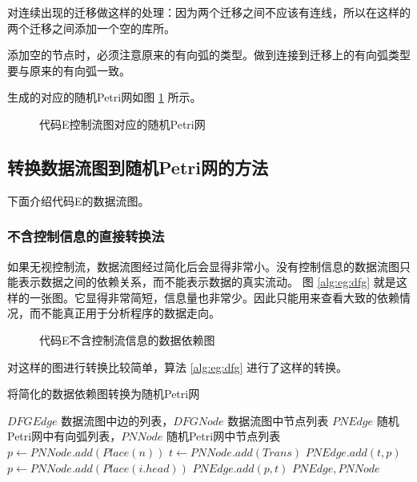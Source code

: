 对连续出现的迁移做这样的处理：因为两个迁移之间不应该有连线，所以在这样的两个迁移之间添加一个空的库所。

添加空的节点时，必须注意原来的有向弧的类型。做到连接到迁移上的有向弧类型要与原来的有向弧一致。

生成的对应的随机Petri网如图 \ref{fig:eg:cfgp} 所示。

\newsavebox{\egcfgp}
\begin{figure}[!hbt]
\centering
\usebox{\egcfgp}
\caption{代码E控制流图对应的随机Petri网} \label{fig:eg:cfgp}
\end{figure}





\subsection{转换数据流图到随机Petri网的方法}

下面介绍代码E的数据流图。

\subsubsection{不含控制信息的直接转换法}
如果无视控制流，数据流图经过简化后会显得非常小。没有控制信息的数据流图只能表示数据之间的依赖关系，而不能表示数据的真实流动。
图 \ref{alg:eg:dfg} 就是这样的一张图。它显得非常简短，信息量也非常少。因此只能用来查看大致的依赖情况，而不能真正用于分析程序的数据走向。

\newsavebox{\egdfg}
\begin{figure}[!hbt]
\centering
\usebox{\egdfg}
\caption{代码E不含控制流信息的数据依赖图} \label{fig:eg:dfg}
\end{figure}

对这样的图进行转换比较简单，算法 \ref{alg:eg:dfg} 进行了这样的转换。

\begin{algorithm}[!hbt]
\caption{将简化的数据依赖图转换为随机Petri网} \label{alg:eg:dfg}
\begin{algorithmic}[1] %
  \Require $DFGEdge$ 数据流图中边的列表，$DFGNode$ 数据流图中节点列表
  \Ensure $PNEdge$ 随机Petri网中有向弧列表，$PNNode$ 随机Petri网中节点列表
          \State $p \gets PNNode.add(Place(n))$
          \State $t \gets PNNode.add(Trans)$
          \State $PNEdge.add(t, p)$
            \State $p \gets PNNode.add(Place(i.head))$
            \State $PNEdge.add(p, t)$
          \EndFor
        \EndIf
      \EndFor
      \State \Return $PNEdge, PNNode$
    \EndFunction
\end{algorithmic}
\end{algorithm}

